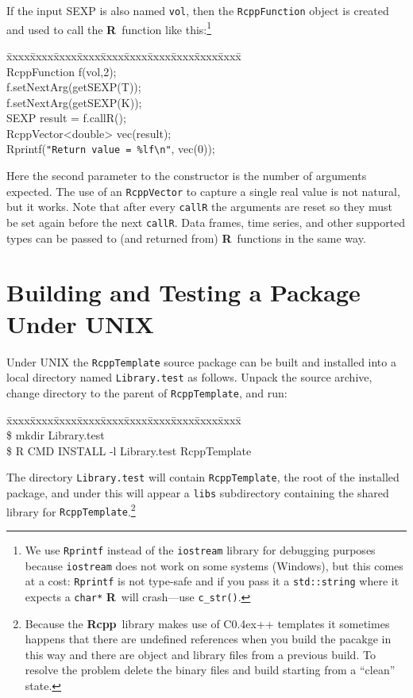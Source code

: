 \documentclass{article}
\newenvironment{program}{\ttfamily\begin{tabbing}
\=xxxx\=xxxx\=xxxx\=xxxx\=xxxx\=xxxx\=xxxx\=xxxx\=xxxx\=xxxx\= \+ \kill \\
}{\end{tabbing}}
\def\C++{C{\raise 0.4ex\hbox{\tiny ++}}}
\newcommand{\R}{{\bf R}}
\newcommand{\Rcpp}{{\bf Rcpp}}
\begin{document}
If the input SEXP is also named {\tt vol}, then the {\tt RcppFunction}
object is created and used to call the \R\ function like this:\footnote{We
  use {\tt Rprintf} instead of the {\tt iostream} library for debugging
  purposes because {\tt iostream} does not work on some
  systems (Windows), but this comes at a cost: 
  {\tt Rprintf} is not type-safe and if
  you pass it a {\tt std::string} where it expects a {\tt char*} \R\ will
  crash---use {\tt c\_str()}.}
\begin{program}
  RcppFunction f(vol,2);\\
  f.setNextArg(getSEXP(T));\\
  f.setNextArg(getSEXP(K));\\
  SEXP result = f.callR();\\
  RcppVector<double> vec(result);\\
  Rprintf(\verb!"Return value = %lf\n"!, vec(0));
\end{program}
Here the second parameter to the constructor is the number of arguments
expected. The use of an {\tt RcppVector} to capture a single real
value is not natural, but it works. Note that after every {\tt callR} the
arguments are reset so they must be set again before the next {\tt callR}.
Data frames, time series, and other supported types can be passed to
(and returned from) \R\ functions in the same way.

\section{Building and Testing a Package Under UNIX}
\label{sec.unix}

Under UNIX the {\tt RcppTemplate} source package can be built and
installed into a local directory named {\tt Library.test} as follows.
Unpack the source archive, change directory to the parent of
{\tt RcppTemplate}, and run:
\begin{program}
\$ mkdir Library.test\\
\$ R CMD INSTALL -l Library.test RcppTemplate
\end{program}
The directory {\tt Library.test} will contain {\tt RcppTemplate}, the
root of the installed package, and under this will appear a {\tt libs}
subdirectory containing the shared library for 
{\tt RcppTemplate}.\footnote{Because the \Rcpp\ library makes use of \C++ 
templates it sometimes
happens that there are undefined references when you build the pacakge
in this way and there are object and library files from a previous build.
To resolve the problem delete the binary files and build starting
from a ``clean'' state.}
\end{document}
